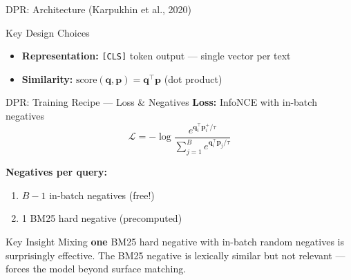 \documentclass[aspectratio=169]{beamer}
\newcommand{\vq}{\mathbf{q}}
\newcommand{\vp}{\mathbf{p}}
\begin{document}
\begin{frame}{DPR: Architecture (Karpukhin et al., 2020)}
\begin{center}
\end{center}

\vspace{0.5em}

\begin{block}{Key Design Choices}
\begin{itemize}
    \item \textbf{Representation:} \texttt{[CLS]} token output --- single vector per text
    \item \textbf{Similarity:} $\text{score}(\vq, \vp) = \vq^\top \vp$ (dot product)
\end{itemize}
\end{block}
\end{frame}

\begin{frame}{DPR: Training Recipe --- Loss \& Negatives}
\textbf{Loss:} InfoNCE with in-batch negatives
$$\mathcal{L} = -\log \frac{e^{\vq_i^\top \vp_i^+/\tau}}{\sum_{j=1}^{B} e^{\vq_i^\top \vp_j / \tau}}$$

\vspace{0.8em}

\textbf{Negatives per query:}
\begin{enumerate}
    \item $B-1$ in-batch negatives (free!)
    \item 1 BM25 hard negative (precomputed)
\end{enumerate}

\vspace{1em}

\begin{exampleblock}{Key Insight}
Mixing \textbf{one} BM25 hard negative with in-batch random negatives is surprisingly effective. The BM25 negative is lexically similar but not relevant --- forces the model beyond surface matching.
\end{exampleblock}
\end{frame}
\end{document}
